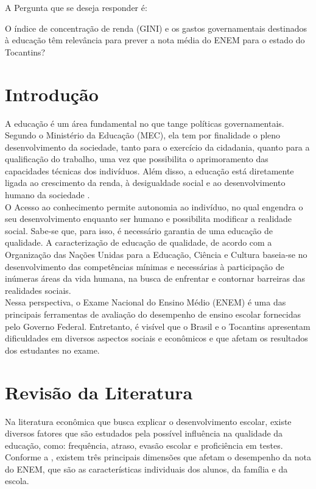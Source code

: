 \documentclass[tcc1,project]{uftex}
\begin{document}
A Pergunta que se deseja responder é: 

O índice de concentração de renda (GINI) e os gastos governamentais destinados à educação têm relevância para prever a nota média do ENEM para o estado do Tocantins? \\

\section*{Introdução}

A educação é um área fundamental no que tange políticas governamentais. Segundo o Ministério da Educação (MEC), ela tem por finalidade o pleno desenvolvimento da sociedade, tanto para o exercício da cidadania, quanto para a qualificação do trabalho, uma vez que possibilita o aprimoramento das capacidades técnicas dos indivíduos. Além disso, a educação está diretamente ligada ao crescimento da renda, à desigualdade social e ao desenvolvimento humano da sociedade \cite{de2021determinantes}.\\

O Acesso ao conhecimento permite autonomia ao indivíduo, no qual engendra o seu desenvolvimento enquanto ser humano e possibilita modificar a realidade social. Sabe-se que, para isso, é necessário garantia de uma educação de qualidade. A caracterização de educação de qualidade, de acordo com a Organização das Nações Unidas para a Educação, Ciência e Cultura baseia-se no desenvolvimento das competências mínimas e necessárias à participação de inúmeras áreas da vida humana, na busca de enfrentar e contornar barreiras das realidades sociais. \cite{deanalise} \\

Nessa perspectiva, o Exame Nacional do Ensino Médio (ENEM) é uma das principais ferramentas de avaliação do desempenho de ensino escolar fornecidas pelo Governo Federal. Entretanto, é visível que o Brasil e o Tocantins apresentam dificuldades em diversos aspectos sociais e econômicos e que afetam os resultados dos estudantes no exame.\\

\section*{Revisão da Literatura}

Na literatura econômica que busca explicar o desenvolvimento escolar, existe diversos fatores que são estudados pela possível influência na qualidade da educação, como: frequência, atraso, evasão escolar e proficiência em testes. Conforme a , existem três principais dimensões que afetam o desempenho da nota do ENEM, que são as características individuais dos alunos, da família e da escola. \\
\end{document}
